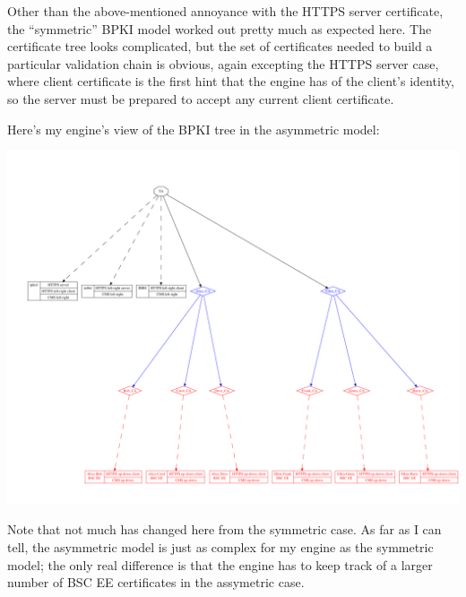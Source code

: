 \documentclass[11pt]{article}
\begin{document}
Other than the above-mentioned annoyance with the HTTPS server
certificate, the ``symmetric'' BPKI model worked out pretty much as
expected here.  The certificate tree looks complicated, but the set of
certificates needed to build a particular validation chain is obvious,
again excepting the HTTPS server case, where client certificate is the
first hint that the engine has of the client's identity, so the server
must be prepared to accept any current client certificate.

Here's my engine's view of the BPKI tree in the asymmetric model:

\begin{center}
\includegraphics[width = 6.5in]{bpki-asymmetric}
\end{center}

Note that not much has changed here from the symmetric case.  As far
as I can tell, the asymmetric model is just as complex for my engine
as the symmetric model; the only real difference is that the engine
has to keep track of a larger number of BSC EE certificates in the
assymetric case.
\end{document}
